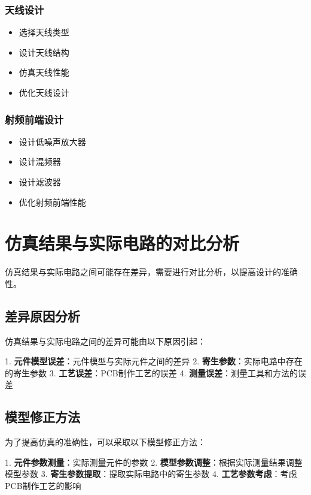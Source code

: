 \documentclass[12pt,UTF8]{ctexbook}
\begin{document}
\subsection{天线设计}\begin{itemize}
  \item 选择天线类型
  \item 设计天线结构
  \item 仿真天线性能
  \item 优化天线设计\end{itemize}

\subsection{射频前端设计}\begin{itemize}
  \item 设计低噪声放大器
  \item 设计混频器
  \item 设计滤波器
  \item 优化射频前端性能\end{itemize}

\chapter{仿真结果与实际电路的对比分析}

仿真结果与实际电路之间可能存在差异，需要进行对比分析，以提高设计的准确性。

\section{差异原因分析}

仿真结果与实际电路之间的差异可能由以下原因引起：

1. \textbf{元件模型误差}：元件模型与实际元件之间的差异
2. \textbf{寄生参数}：实际电路中存在的寄生参数
3. \textbf{工艺误差}：PCB制作工艺的误差
4. \textbf{测量误差}：测量工具和方法的误差

\section{模型修正方法}

为了提高仿真的准确性，可以采取以下模型修正方法：

1. \textbf{元件参数测量}：实际测量元件的参数
2. \textbf{模型参数调整}：根据实际测量结果调整模型参数
3. \textbf{寄生参数提取}：提取实际电路中的寄生参数
4. \textbf{工艺参数考虑}：考虑PCB制作工艺的影响
\end{document}
